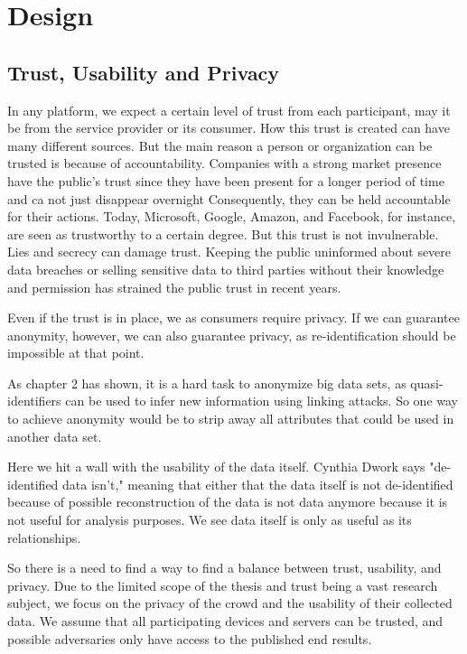 
\chapter{Design}\label{chapter:design}
\section{Trust, Usability and Privacy}
In any platform, we expect a certain level of trust from each participant, may it be from the service provider or its consumer. How this trust is created can have many different sources. But the main reason a person or organization can be trusted is because of accountability. Companies with a strong market presence have the public's trust since they have been present for a longer period of time and ca not just disappear overnight
 Consequently, they can be held accountable for their actions. Today, Microsoft, Google, Amazon, and Facebook, for instance, are seen as trustworthy to a certain degree. But this trust is not invulnerable. Lies and secrecy can damage trust. Keeping the public uninformed about severe data breaches or selling sensitive data to third parties without their knowledge and permission has strained the public trust in recent years.

Even if the trust is in place, we as consumers require privacy. If we can guarantee anonymity, however, we can also guarantee privacy, as re-identification should be impossible at that point.

As chapter 2 has shown, it is a hard task to anonymize big data sets, as quasi-identifiers can be used to infer new information using linking attacks. So one way to achieve anonymity would be to strip away all attributes that could be used in another data set.

Here we hit a wall with the usability of the data itself. Cynthia Dwork says "de-identified data isn't,"
meaning that either that the data itself is not de-identified because of possible reconstruction of the data is not data anymore because it is not useful for analysis purposes. We see data itself is only as useful as its relationships.

So there is a need to find a way to find a balance between trust, usability, and privacy. Due to the limited scope of the thesis and trust being a vast research subject, we focus on the privacy of the crowd and the usability of their collected data. We assume that all participating devices and servers can be trusted, and possible adversaries only have access to the published end results.

